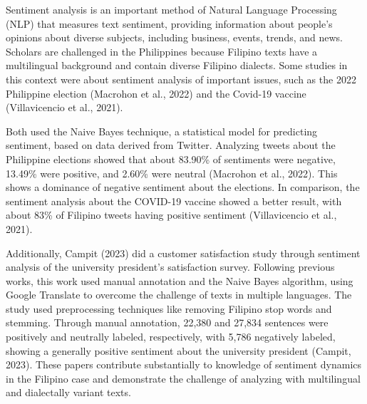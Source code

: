 Sentiment analysis is an important method of Natural Language Processing (NLP) that measures text sentiment, providing information about people's opinions about diverse subjects, including business, events, trends, and news. Scholars are challenged in the Philippines because Filipino texts have a multilingual background and contain diverse Filipino dialects. Some studies in this context were about sentiment analysis of important issues, such as the 2022 Philippine election (Macrohon et al., 2022) and the Covid-19 vaccine (Villavicencio et al., 2021).

Both used the Naive Bayes technique, a statistical model for predicting sentiment, based on data derived from Twitter. Analyzing tweets about the Philippine elections showed that about 83.90\% of sentiments were negative, 13.49\% were positive, and 2.60\% were neutral (Macrohon et al., 2022). This shows a dominance of negative sentiment about the elections. In comparison, the sentiment analysis about the COVID-19 vaccine showed a better result, with about 83\% of Filipino tweets having positive sentiment (Villavicencio et al., 2021).

Additionally, Campit (2023) did a customer satisfaction study through sentiment analysis of the university president's satisfaction survey. Following previous works, this work used manual annotation and the Naive Bayes algorithm, using Google Translate to overcome the challenge of texts in multiple languages. The study used preprocessing techniques like removing Filipino stop words and stemming. Through manual annotation, 22,380 and 27,834 sentences were positively and neutrally labeled, respectively, with 5,786 negatively labeled, showing a generally positive sentiment about the university president (Campit, 2023). These papers contribute substantially to knowledge of sentiment dynamics in the Filipino case and demonstrate the challenge of analyzing with multilingual and dialectally variant texts.


